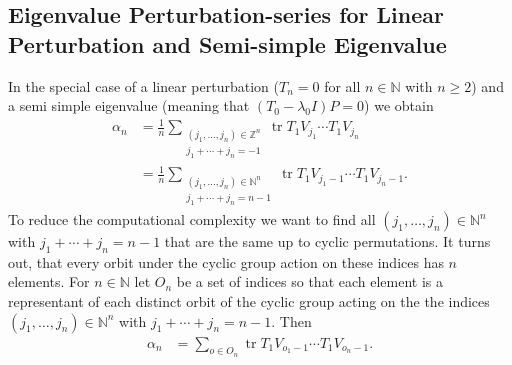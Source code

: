 \documentclass[11pt, a4paper]{article} %
\numberwithin{equation}{subsection} %
\theoremstyle{definition} %
\theoremstyle{plain} %
\DeclareMathOperator{\tr}{tr}
\begin{document}
\subsection{Eigenvalue Perturbation-series for Linear Perturbation and Semi-simple Eigenvalue}
In the special case of a linear perturbation ($T_n =0$ for all $n \in \mathbb{N}$ with $n\geq2$)
and a semi simple eigenvalue (meaning that $(T_0- \lambda_0 I) P =0$)
we obtain
\begin{equation}
	\begin{split}
		\alpha_n &=  \frac{1}{n} \sum_{ \substack{(j_1, \dots, j_n) \in \mathbb{Z}^n \\ j_1 + \cdots + j_n = -1}}
		\tr T_{1} V_{j_1} \cdots T_{1} V_{j_n}\\
		&= \frac{1}{n} \sum_{ \substack{(j_1, \dots, j_n) \in \mathbb{N}^n \\ j_1 + \cdots + j_n = n -1}}
		\tr T_{1} V_{j_1-1} \cdots T_{1} V_{j_n-1}.
	\end{split}
\end{equation}
To reduce the computational complexity we want to find
all $(j_1, \dots, j_n) \in \mathbb{N}^n  $ with $ j_1 + \cdots + j_n = n -1$
that are the same
up to cyclic permutations.
It turns out, that every orbit under the cyclic group action on these indices has $n$ elements.
For $n \in \mathbb{N}$ let $O_n$ be a set of indices so that each element is a representant of each distinct orbit of the cyclic group acting on the the indices
$(j_1, \dots, j_n) \in \mathbb{N}^n  $ with $ j_1 + \cdots + j_n = n -1$.
Then
\begin{equation}
	\begin{split}
		\alpha_n &= \sum_{o \in O_n }
		\tr T_{1} V_{o_1-1} \cdots T_{1} V_{o_n-1}.
	\end{split}
\end{equation}
\end{document}
